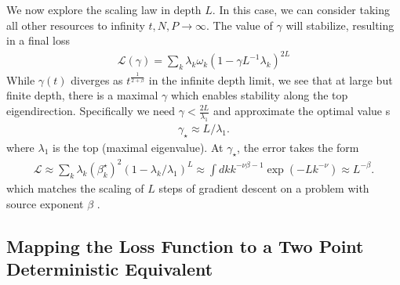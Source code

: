 \documentclass{article} %
\begin{document}
We now explore the scaling law in depth $L$. In this case, we can consider taking all other resources to infinity $t,N,P \to \infty$. The value of $\gamma$ will stabilize, resulting in a final loss
\begin{align}
    \mathcal L(\gamma) = \sum_k \lambda_k \omega_k \left( 1 - \gamma L^{-1} \lambda_k  \right)^{2L} 
\end{align}
While $\gamma(t)$ diverges as $t^{\frac{1}{2+\beta}}$ in the infinite depth limit, we see that at large but finite depth, there is a maximal $\gamma$ which enables stability along the top eigendirection. Specifically we need $\gamma < \frac{2L}{\lambda_1}$ and approximate the optimal value s
\begin{align}
    \gamma_\star \approx L / \lambda_1   .
\end{align}
where $\lambda_1$ is the top (maximal eigenvalue). At $\gamma_\star$, the error takes the form
\begin{align}
    \mathcal L \approx \sum_{k} \lambda_k (\beta^\star_k)^2 \left( 1 - \lambda_k / \lambda_1  \right)^L \approx \int dk k^{-\nu\beta-1} \exp(-L k^{-\nu}) \approx  L^{-\beta} . 
\end{align}
which matches the scaling of $L$ steps of gradient descent on a problem with source exponent $\beta$ \cite{bordelon2021learning}.


\subsection{Mapping the Loss Function to a Two Point Deterministic Equivalent}
\end{document}
